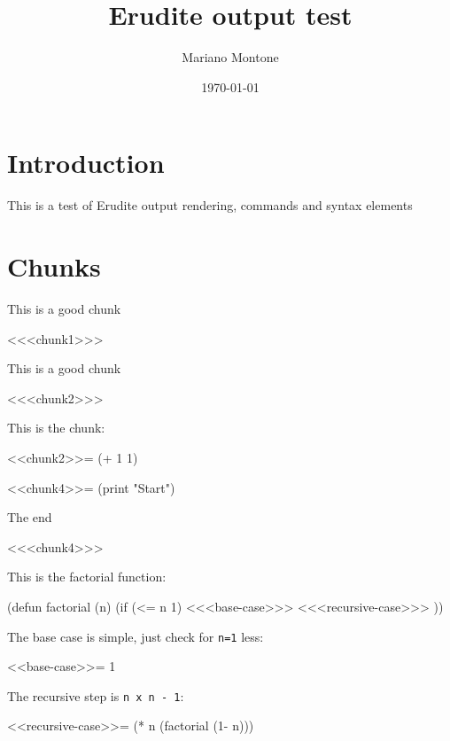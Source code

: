 \documentclass[11pt,pdflatex,makeidx]{scrbook}   %
\begin{document}
\title{\bf Erudite output test}


\author{Mariano Montone}

\date{\today}                           %
\frontmatter                            %
\maketitle                              %
\tableofcontents                        %
\mainmatter                             %
\long\def\ignore#1{}

\section{Introduction}

This is a test of Erudite output rendering, commands and syntax elements

\section{Chunks}

This is a good chunk
\begin{code}
<<<chunk1>>>
\end{code}

This is a good chunk
\begin{code}
<<<chunk2>>>
\end{code}
This is the chunk:
\begin{code}
<<chunk2>>=
(+ 1 1)

\end{code}

\begin{code}
<<chunk4>>=
(print "Start")

\end{code}
The end
\begin{code}
<<<chunk4>>>
\end{code}

This is the factorial function:
\label{factorial}

\begin{code}
(defun factorial (n)
  (if (<= n 1)
<<<base-case>>>
<<<recursive-case>>>
      ))

\end{code}
The base case is simple, just check for \verb|n=1| less:
\begin{code}
<<base-case>>=
      1

\end{code}
The recursive step is \verb|n x n - 1|:
\begin{code}
<<recursive-case>>=
      (* n (factorial (1- n)))

\end{code}
\end{document}
